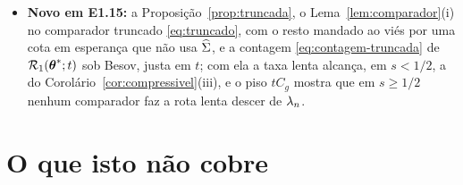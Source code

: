 \documentclass[11pt,a4paper]{article}
\begin{document}
\begin{itemize}[nosep, leftmargin=*]
    $\pen$ inflado por $\mu_{J}^{1/2}$ \eqref{eq:smax-teto}; acima do teto o
    expoente é estritamente melhor que o de $J$ parado nele
    (Observação~\ref{rem:teto}).
  \item \textbf{Novo em E1.15:} a Proposição~\ref{prop:truncada}, o
    Lema~\ref{lem:comparador}(i) no comparador truncado
    \eqref{eq:truncado}, com o resto mandado ao viés por uma cota em
    esperança que não usa $\widehat{\Sigma}$, e a contagem
    \eqref{eq:contagem-truncada} de $\mathcal{R}_{1}(\boldsymbol{\theta}^{*};t)$ sob Besov,
    justa em $t$; com ela a taxa lenta alcança, em $s < 1/2$, a do
    Corolário~\ref{cor:compressivel}(iii), e o piso $tC_{g}$ mostra que em
    $s \ge 1/2$ nenhum comparador faz a rota lenta descer de $\lambda_{n}$.
\end{itemize}

\section{O que isto não cobre}
\end{document}
